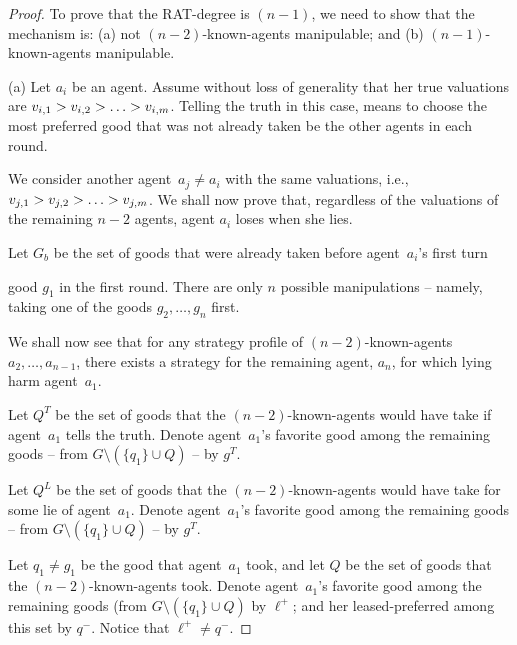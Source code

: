\begin{proof}
    To prove that the RAT-degree is $(n-1)$, we need to show that the mechanism is: (a) not $(n-2)$-known-agents manipulable; and 
    (b) $(n-1)$-known-agents manipulable.

    (a) Let $a_i$ be an agent. Assume without loss of generality that her true valuations are $v_{i,1} > v_{i,2} > \ldots > v_{i,m}$.
    Telling the truth in this case, means to choose the most preferred good that was not already taken be the other agents in each round.

    We consider another agent~$a_j \neq a_i$ with the same valuations, i.e., $v_{j,1} > v_{j,2} > \ldots > v_{j,m}$.
    We shall now prove that, regardless of the valuations of the remaining $n-2$ agents, agent $a_i$ loses when she lies.  

    Let $G_b$ be the set of goods that were already taken before agent~$a_i$'s first turn
    
    
    
    
    
    
    good $g_1$ in the first round. 
    There are only $n$ possible manipulations -- namely, taking one of the goods $g_2,\ldots,g_n$ first.

     We shall now see that for any strategy profile of $(n-2)$-known-agents $a_2,\ldots, a_{n-1}$, there exists a strategy for the remaining agent, $a_n$, for which lying harm agent~$a_1$.

     Let $Q^T$ be the set of goods that the $(n-2)$-known-agents would have take if agent~$a_1$ tells the truth. Denote agent~$a_1$'s favorite good among the remaining goods -- from $G \setminus (\{q_1\} \cup Q)$ -- by $g^T$.

     Let $Q^L$ be the set of goods that the $(n-2)$-known-agents would have take for some lie of agent~$a_1$. Denote agent~$a_1$'s favorite good among the remaining goods -- from $G \setminus (\{q_1\} \cup Q)$ -- by $g^T$.

    Let $q_1 \neq g_1$ be the good that agent~$a_1$ took, and let $Q$ be the set of goods that the $(n-2)$-known-agents took.
    Denote agent~$a_1$'s favorite good among the remaining goods (from $G \setminus (\{q_1\} \cup Q)$ by $\ell^+$; and her leased-preferred among this set by $q^-$.
    Notice that $\ell^+ \neq q^-$.


\end{proof}
